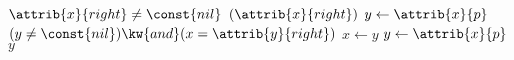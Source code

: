 \begin{codebox}
\li \If $\attrib{x}{right} \neq \const{nil}$
\li \Then 
		\Return {}$(\attrib{x}{right})$
\li \Else
\li 	$y \gets \attrib{x}{p}$
\li 	\While $(y \neq \const{nil}) \kw{ and } (x = \attrib{y}{right})$
\li 	\Do
			$x \gets y$
\li 		$y \gets \attrib{x}{p}$
		\End
\li 	\Return $y$
	\End
\end{codebox}